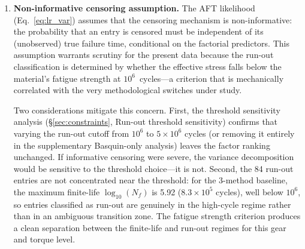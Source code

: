 \documentclass[twocolumn,12pt,a4paper]{article}
\begin{document}
\begin{enumerate}
        I caution that the narrow bootstrap CIs for the dominant factors
        quantify \emph{sampling} variability conditional on the observed
        censoring pattern, not the \emph{identifiability} of the
        underlying parameters. At 58\% censoring, the likelihood surface
        may possess shallow local maxima or flat ridges that bootstrap
        resampling cannot detect because each bootstrap replicate
        inherits the same censoring structure. The numerical variance
        fractions for the three dominant factors (55.3\%, 22.6\%,
        18.2\%) represent the best available
        point estimates under the log-normal AFT specification, not as
        uniquely identified values. As a practical check, the EM decomposition
        was repeated with 8 different random seeds; the variance fractions are
        identical to the reported precision across all seeds, confirming that
        the likelihood surface possesses a well-defined global maximum at 58\%
        censoring for this dataset. Their qualitative ranking
        (Std dominant, Rz $\gtrsim$ MS) is robust across all bootstrap replicates
        and sensitivity analyses reported in this study. The S--N
        curve source (2.5\%, CI [1.3, 3.7];
        Table~\ref{tab:anova}) is identifiable, while the cumulative
        damage rule (0.3\%) is at the noise floor of the 58\%-censored
        design and should not be assigned physical interpretation.

  \item \textbf{Non-informative censoring assumption.} The AFT likelihood
        (Eq.~\ref{eq:lr_var}) assumes that the censoring mechanism is
        non-informative: the probability that an entry is censored must
        be independent of its (unobserved) true failure time, conditional
        on the factorial predictors. This assumption warrants scrutiny
        for the present data because the run-out classification is
        determined by whether the effective stress falls below the
        material's fatigue strength at $10^6$~cycles---a criterion that
        is mechanically correlated with the very methodological switches
        under study.

        Two considerations mitigate this concern. First, the threshold
        sensitivity analysis (\S\ref{sec:constraints}, Run-out threshold
        sensitivity) confirms that varying the run-out cutoff from
        $10^6$ to $5\times10^6$ cycles (or removing it entirely in the
        supplementary Basquin-only analysis) leaves the factor ranking
        unchanged. If informative censoring were severe, the variance
        decomposition would be sensitive to the threshold choice---it is
        not. Second, the 84 run-out entries are not concentrated near the
        threshold: for the 3-method baseline, the maximum finite-life
        $\log_{10}(N_f)$ is 5.92 ($8.3\times10^5$ cycles), well below
        $10^6$, so entries classified as run-out are genuinely in the
        high-cycle regime rather than in an ambiguous transition zone.
        The fatigue strength criterion produces a clean separation
        between the finite-life and run-out regimes for this gear and
        torque level.


\end{enumerate}
\end{document}
